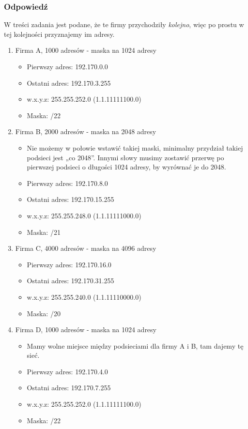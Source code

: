 		\subsubsection{Odpowiedź}
			W treści zadania jest podane, że te firmy przychodziły \textit{kolejno}, więc po prostu w tej kolejności przyznajemy im adresy.
			\begin{enumerate}
				\item Firma A, 1000 adresów - maska na 1024 adresy
				\begin{itemize}
					\item Pierwszy adres: 192.170.0.0
					\item Ostatni adres: 192.170.3.255
					\item w.x.y.z: 255.255.252.0 (1.1.11111100.0)
					\item Maska: /22
				\end{itemize}
				\item Firma B, 2000 adresów - maska na 2048 adresy
				\begin{itemize}
					\item Nie możemy w połowie wstawić takiej maski, minimalny przydział takiej podsieci jest „co 2048”. Innymi słowy musimy zostawić przerwę po pierwszej podsieci o długości 1024 adresy, by wyrównać je do 2048.
					\item Pierwszy adres: 192.170.8.0
					\item Ostatni adres: 192.170.15.255
					\item w.x.y.z: 255.255.248.0 (1.1.11111000.0)
					\item Maska: /21
				\end{itemize}
				\item Firma C, 4000 adresów - maska na 4096 adresy
				\begin{itemize}
					\item Pierwszy adres: 192.170.16.0
					\item Ostatni adres: 192.170.31.255
					\item w.x.y.z: 255.255.240.0 (1.1.11110000.0)
					\item Maska: /20
				\end{itemize}
				\item Firma D, 1000 adresów - maska na 1024 adresy
				\begin{itemize}
					\item Mamy wolne miejsce między podsieciami dla firmy A i B, tam dajemy tę sieć.
					\item Pierwszy adres: 192.170.4.0
					\item Ostatni adres: 192.170.7.255
					\item w.x.y.z: 255.255.252.0 (1.1.11111100.0)
					\item Maska: /22
				\end{itemize}
			\end{enumerate}
